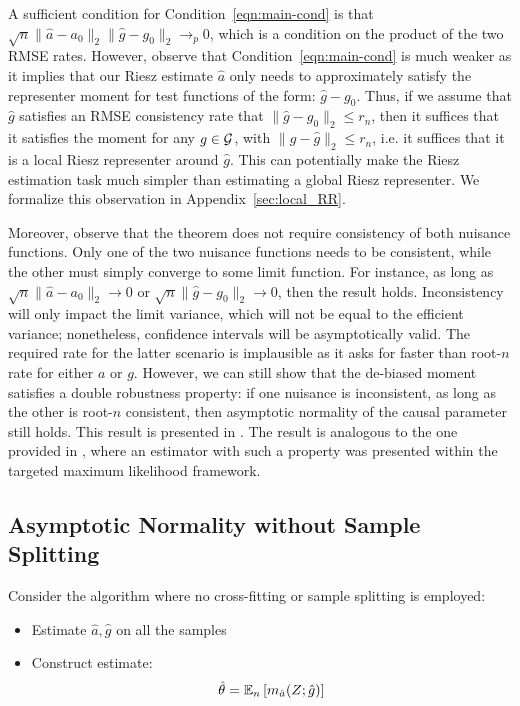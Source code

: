 A sufficient condition for Condition~\ref{eqn:main-cond} is that $\sqrt{n} \|\hat{a}-a_0\|_2 \|\hat{g} - g_0\|_2 \to_p 0$, which is a condition on the product of the two RMSE rates. However, observe that Condition~\eqref{eqn:main-cond} is much weaker as it implies that our Riesz estimate $\hat{a}$ only needs to approximately satisfy the representer moment for test functions of the form: $\hat{g}-g_0$. Thus, if we assume that $\hat{g}$ satisfies an RMSE consistency rate that $\|\hat{g}-g_0\|_2\leq r_n$, then it suffices that it satisfies the moment for any $g\in {\cal G}$, with $\|g-\hat{g}\|_2\leq r_n$, i.e. it suffices that it is a local Riesz representer around $\hat{g}$. This can potentially make the Riesz estimation task much simpler than estimating a global Riesz representer. We formalize this observation in Appendix~\ref{sec:local_RR}.

Moreover, observe that the theorem does not require consistency of both nuisance functions. Only one of the two nuisance functions needs to be consistent, while the other must simply converge to some limit function. For instance, as long as $\sqrt{n} \|\hat{a}-a_0\|_2\to 0$ or $\sqrt{n}\|\hat{g}-g_0\|_2 \to 0$, then the result holds. Inconsistency will only impact the limit variance, which will not be equal to the efficient variance; nonetheless, confidence intervals will be asymptotically valid. The required rate for the latter scenario is implausible as it asks for faster than root-$n$ rate for either $a$ or $g$. However, we can still show that the de-biased moment satisfies a double robustness property: if one nuisance is inconsistent, as long as the other is root-$n$ consistent, then asymptotic normality of the causal parameter still holds. This result is presented in . The result is analogous to the one provided in \cite{Benkeser2017}, where an estimator with such a property was presented within the targeted maximum likelihood framework.


\subsection{Asymptotic Normality without Sample Splitting}

Consider the algorithm where no cross-fitting or sample splitting is employed:
\begin{itemize}
    \item Estimate $\hat{a}, \hat{g}$ on all the samples
    \item Construct estimate:
    \begin{equation}
        \hat{\theta} = \mathbb{E}_n\left[m_{\hat{a}}(Z; \hat{g})\right]
    \end{equation}
\end{itemize}

